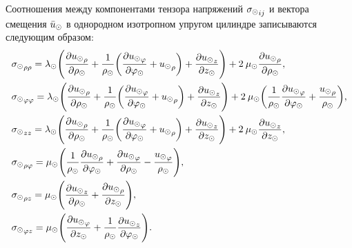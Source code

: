 Соотношения между компонентами тензора напряжений ${\sigma_\odot}_{ij}$ и вектора смещения $\bar{u}_\odot$ в однородном изотропном упругом цилиндре записываются следующим образом:
\begin{equation}\label{tenzor_napr}
\begin{aligned}
&{\sigma_\odot}_{\rho\rho}=\lambda_\odot\Biggl(\frac{\partial {u_\odot}_{\rho}}{\partial \rho_\odot}+\frac{1}{\rho_\odot}\biggl(\frac{\partial {u_\odot}_{\varphi}}{\partial\varphi_\odot}+{u_\odot}_{\rho}\biggr)+\frac{\partial {u_\odot}_{z}}{\partial z_\odot}\Biggr)+2\:\mu_\odot\frac{\partial {u_\odot}_{\rho}}{\partial \rho_\odot},\\
&{\sigma_\odot}_{\varphi\varphi}=\lambda_\odot\Biggl(\frac{\partial {u_\odot}_{\rho}}{\partial \rho_\odot}+\frac{1}{\rho_\odot}\biggl(\frac{\partial {u_\odot}_{\varphi}}{\partial\varphi_\odot}+{u_\odot}_{\rho}\biggr)+\frac{\partial {u_\odot}_{z}}{\partial z_\odot}\Biggr)+2\:\mu_\odot\biggl(\frac{1}{\rho_\odot}\frac{\partial {u_\odot}_{\varphi}}{\partial\varphi_\odot}+\frac{{u_\odot}_{\rho}}{\rho_\odot}\biggr),\\
&{\sigma_\odot}_{zz}=\lambda_\odot\Biggl(\frac{\partial {u_\odot}_{\rho}}{\partial \rho_\odot}+\frac{1}{\rho_\odot}\biggl(\frac{\partial {u_\odot}_{\varphi}}{\partial\varphi_\odot}+{u_\odot}_{\rho}\biggr)+\frac{\partial {u_\odot}_{z}}{\partial z_\odot}\Biggr)+2\:\mu_\odot\frac{\partial {u_\odot}_{z}}{\partial z_\odot},\\
&{\sigma_\odot}_{\rho\varphi}=\mu_\odot\Biggl(\frac{1}{\rho_\odot}\frac{\partial {u_\odot}_{\rho}}{\partial\varphi_\odot}+\frac{\partial {u_\odot}_{\varphi}}{\partial \rho_\odot}-\frac{{u_\odot}_{\varphi}}{\rho_\odot}\Biggr),\\
&{\sigma_\odot}_{\rho z}=\mu_\odot\Biggl(\frac{\partial {u_\odot}_{z}}{\partial \rho_\odot}+\frac{\partial {u_\odot}_{\rho}}{\partial z_\odot}\Biggr),\\
&{\sigma_\odot}_{\varphi z}=\mu_\odot\Biggl(\frac{\partial {u_\odot}_{\varphi}}{\partial z_\odot}+\frac{1}{\rho_\odot}\frac{\partial {u_\odot}_{z}}{\partial \varphi_\odot}\Biggr).
\end{aligned}
\end{equation}

